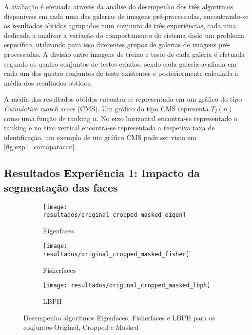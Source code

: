 A avaliação é efetuada através da análise do desempenho dos três algoritmos disponíveis em cada uma das galerias de imagens pré-processadas, encontrando-se os resultados obtidos agrupados num conjunto de três experiências, cada uma dedicada a analisar a variação do comportamento do sistema dado um problema específico, utilizando para isso diferentes grupos de galerias de imagens pré-processadas. A divisão entre imagens de treino e teste de cada galeria é efetuada segundo os quatro conjuntos de testes criados, sendo cada galeria avaliada em cada um dos quatro conjuntos de teste existentes e posteriormente calculada a média dos resultados obtidos.

A média dos resultados obtidos encontra-se representada em um gráfico do tipo \textit{Cumulative match score} (CMS). Um gráfico do tipo CMS representa $T_{I}(n)$ como uma função de ranking $n$. No eixo horizontal encontra-se representado o ranking e no eixo vertical encontra-se representada a respetiva taxa de identificação, um exemplo de um gráfico CMS pode ser visto em \ref{fig:exp1_comaparacao}.

\subsection{Resultados Experiência 1: Impacto da segmentação das faces}

\begin{figure}[p]
        \centering
        \begin{subfigure}[b]{0.58\textwidth}
                \centering
                \texttt{[image: resultados/original\_cropped\_masked\_eigen]}
                \caption{Eigenfaces}
                \label{fig:original_cropped_masked_eigen}
        \end{subfigure}%

        \begin{subfigure}[b]{0.58\textwidth}
                \centering
                \texttt{[image: resultados/original\_cropped\_masked\_fisher]}
                \caption{Fisherfaces}
                \label{fig:original_cropped_masked_fisher}
        \end{subfigure}

        \begin{subfigure}[b]{0.58\textwidth}
                \centering
                \texttt{[image: resultados/original\_cropped\_masked\_lbph]}
                \caption{LBPH}
                \label{fig:original_cropped_masked_lbph}
        \end{subfigure}
        \caption{Desempenho algoritmos Eigenfaces, Fisherfaces e LBPH para os conjuntos Original, Cropped e Masked}
        \label{fig:original_cropped_masked}
\end{figure}

